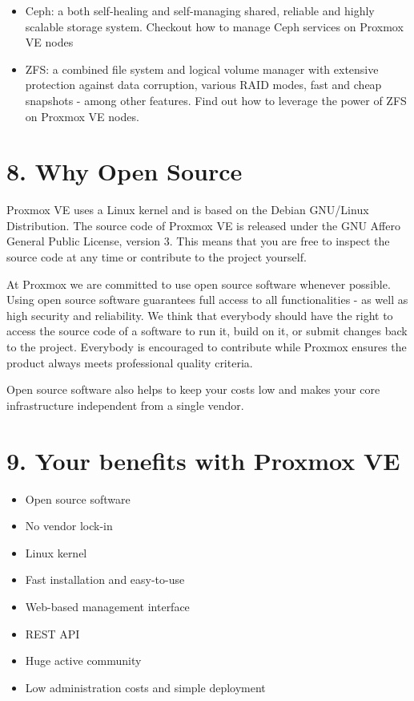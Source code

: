 \begin{itemize}[leftmargin=2cm]

	\item Ceph: a both self-healing and self-managing shared, reliable and highly scalable storage system. Checkout how to manage Ceph services on Proxmox VE nodes

	\item ZFS: a combined file system and logical volume manager with extensive protection against data corruption, various RAID modes, fast and cheap snapshots - among other features. Find out how to leverage the power of ZFS on Proxmox VE nodes.

\end{itemize}


\section{8. Why Open Source}

Proxmox VE uses a Linux kernel and is based on the Debian GNU/Linux Distribution. The source code of Proxmox VE is released under the GNU Affero General Public License, version 3. This means that you are free to inspect the source code at any time or contribute to the project yourself.

At Proxmox we are committed to use open source software whenever possible. Using open source software guarantees full access to all functionalities - as well as high security and reliability. We think that everybody should have the right to access the source code of a software to run it, build on it, or submit changes back to the project. Everybody is encouraged to contribute while Proxmox ensures the product always meets professional quality criteria.

Open source software also helps to keep your costs low and makes your core infrastructure independent from a single vendor.


\section{9. Your benefits with Proxmox VE}

\begin{itemize}[leftmargin=2cm]

	\item Open source software

	\item No vendor lock-in

	\item Linux kernel

	\item Fast installation and easy-to-use

	\item Web-based management interface

	\item REST API

	\item Huge active community

	\item Low administration costs and simple deployment

\end{itemize}


